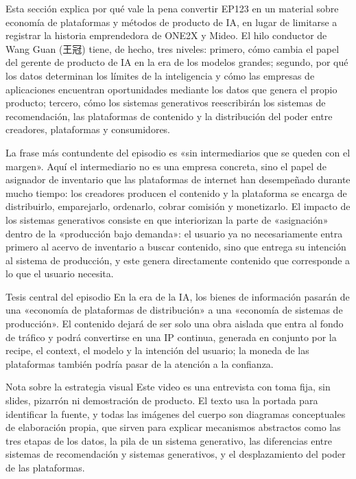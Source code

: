 \documentclass[a4paper]{article}
\begin{document}
Esta sección explica por qué vale la pena convertir EP123 en un material sobre economía de plataformas y métodos de producto de IA, en lugar de limitarse a registrar la historia emprendedora de ONE2X y Mideo. El hilo conductor de Wang Guan (王冠) tiene, de hecho, tres niveles: primero, cómo cambia el papel del gerente de producto de IA en la era de los modelos grandes; segundo, por qué los datos determinan los límites de la inteligencia y cómo las empresas de aplicaciones encuentran oportunidades mediante los datos que genera el propio producto; tercero, cómo los sistemas generativos reescribirán los sistemas de recomendación, las plataformas de contenido y la distribución del poder entre creadores, plataformas y consumidores.

La frase más contundente del episodio es «sin intermediarios que se queden con el margen». Aquí el intermediario no es una empresa concreta, sino el papel de asignador de inventario que las plataformas de internet han desempeñado durante mucho tiempo: los creadores producen el contenido y la plataforma se encarga de distribuirlo, emparejarlo, ordenarlo, cobrar comisión y monetizarlo. El impacto de los sistemas generativos consiste en que interiorizan la parte de «asignación» dentro de la «producción bajo demanda»: el usuario ya no necesariamente entra primero al acervo de inventario a buscar contenido, sino que entrega su intención al sistema de producción, y este genera directamente contenido que corresponde a lo que el usuario necesita.

\begin{importantbox}{Tesis central del episodio}
En la era de la IA, los bienes de información pasarán de una «economía de plataformas de distribución» a una «economía de sistemas de producción». El contenido dejará de ser solo una obra aislada que entra al fondo de tráfico y podrá convertirse en una IP continua, generada en conjunto por la recipe, el context, el modelo y la intención del usuario; la moneda de las plataformas también podría pasar de la atención a la confianza.
\end{importantbox}

\begin{knowledgebox}{Nota sobre la estrategia visual}
Este video es una entrevista con toma fija, sin slides, pizarrón ni demostración de producto. El texto usa la portada para identificar la fuente, y todas las imágenes del cuerpo son diagramas conceptuales de elaboración propia, que sirven para explicar mecanismos abstractos como las tres etapas de los datos, la pila de un sistema generativo, las diferencias entre sistemas de recomendación y sistemas generativos, y el desplazamiento del poder de las plataformas.
\end{knowledgebox}
\end{document}
